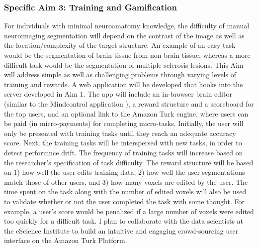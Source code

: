 

\subsubsection*{Specific Aim 3: Training and Gamification}

For individuals with minimal neuroamatomy knowledge, the difficulty of manual neuroimaging segmentation will depend on the contrast of the image as well as the location/complexity of the target structure. An example of an easy task would be the segmentation of brain tissue from non-brain tissue, whereas a more difficult task would be the segmentation of multiple sclerosis lesions. This Aim will address simple as well as challenging problems through varying levels of training and rewards. A web application will be developed that hooks into the server developed in Aim 1. The app will include an in-browser brain editor (similar to the Mindcontrol application \cite{keshavan2016mindcontrol}), a reward structure and a scoreboard for the top users, and an optional link to the Amazon Turk engine, where users can be paid (in micro-payments) for completing micro-tasks. Initially, the user will only be presented with training tasks until they reach an adequate accuracy score. Next, the training tasks will be interspersed with new tasks, in order to detect performnce drift. The frequency of training tasks will increase based on the researcher's specification of task difficulty. The reward structure will be based on 1) how well the user edits training data, 2) how well the user segmentations match those of other users, and 3) how many voxels are edited by the user. The time spent on the task along with the number of edited voxels will also be used to validate whether or not the user completed the task with some thought. For example, a user's score would be penalized if a large number of voxels were edited too quickly for a difficult task. I plan to collaborate with the data scientists at the eScience Institute to build an intuitive and engaging crowd-sourcing user interface on the Amazon Turk Platform.